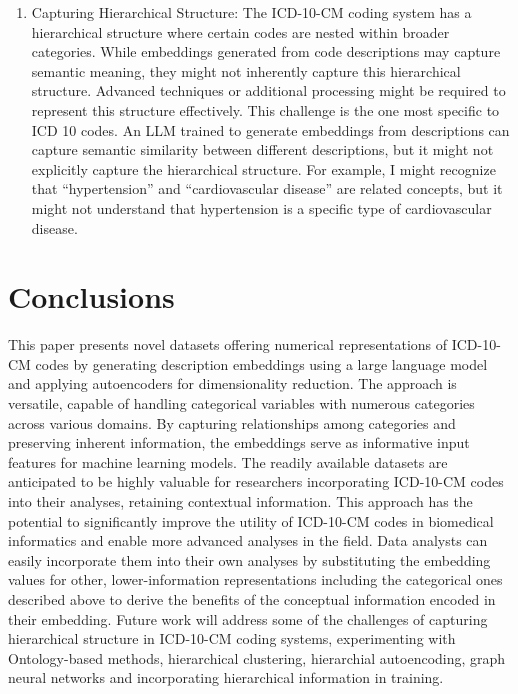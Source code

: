 \documentclass{bmcart}
\begin{document}
\begin{enumerate}
\item Capturing Hierarchical Structure: The ICD-10-CM coding system has a hierarchical structure where certain codes are nested within broader categories. While embeddings generated from code descriptions may capture semantic meaning, they might not inherently capture this hierarchical structure. Advanced techniques or additional processing might be required to represent this structure effectively. This challenge is the one most specific to ICD 10 codes. An LLM trained to generate embeddings from descriptions can capture semantic similarity between different descriptions, but it might not explicitly capture the hierarchical structure. For example, I might recognize that ``hypertension'' and ``cardiovascular disease'' are related concepts, but it might not understand that hypertension is a
specific type of cardiovascular disease.
\end{enumerate}

\section*{Conclusions}

This paper presents novel datasets offering numerical representations of 
ICD-10-CM codes by generating description embeddings using a large language 
model and applying autoencoders for dimensionality reduction. The approach is 
versatile, capable of handling categorical variables with numerous categories 
across various domains. By capturing relationships among categories and 
preserving inherent information, the embeddings serve as informative input 
features for machine learning models.  The readily available datasets are 
anticipated to be highly valuable for researchers incorporating ICD-10-CM 
codes into their analyses, retaining contextual information. This approach 
has the potential to significantly improve the utility of ICD-10-CM codes in 
biomedical informatics and enable more advanced analyses in the field.
Data analysts can easily incorporate them into their own analyses by 
substituting the embedding values for other, lower-information representations
including the categorical ones described above to derive the benefits
of the conceptual information encoded in their embedding.
Future work will address some of the challenges of capturing hierarchical
structure in ICD-10-CM coding systems, experimenting with Ontology-based 
methods, hierarchical clustering, hierarchial autoencoding, graph neural 
networks and incorporating hierarchical information in training.
\end{document}
